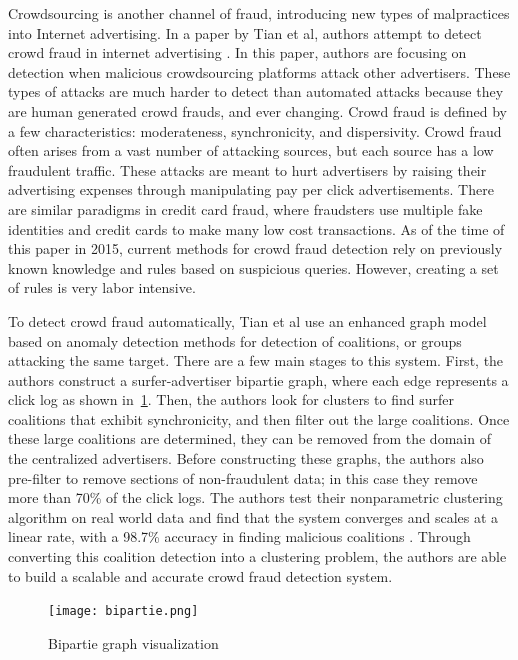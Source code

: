 \documentclass[midd]{thesis}
\begin{document}
Crowdsourcing is another channel of fraud, introducing new types of malpractices into Internet advertising. In a paper by Tian et al, authors attempt to detect crowd fraud in internet advertising  \cite{Tian}. In this paper, authors are focusing on detection when malicious crowdsourcing platforms attack other advertisers. These types of attacks are much harder to detect than automated attacks because they are human generated crowd frauds, and ever changing. Crowd fraud is defined by a few characteristics: moderateness, synchronicity, and dispersivity. Crowd fraud often arises from a vast number of attacking sources, but each source has a low fraudulent traffic. These attacks are meant to hurt advertisers by raising their advertising expenses through manipulating pay per click advertisements. There are similar paradigms in credit card fraud, where fraudsters use multiple fake identities and credit cards to make many low cost transactions. As of the time of this paper in 2015, current methods for crowd fraud detection rely on previously known knowledge and rules based on suspicious queries. However, creating a set of rules is very labor intensive. 

To detect crowd fraud automatically, Tian et al use an enhanced graph model based on anomaly detection methods for detection of coalitions, or groups attacking the same target. There are a few main stages to this system. First, the authors construct a surfer-advertiser bipartie graph, where each edge represents a click log as shown in~\ref{fig:bipartie}. Then, the authors look for clusters to find surfer coalitions that exhibit synchronicity, and then filter out the large coalitions. Once these large coalitions are determined, they can be removed from the domain of the centralized advertisers. Before constructing these graphs, the authors also pre-filter to remove sections of non-fraudulent data; in this case they remove more than 70\% of the click logs. The authors test their nonparametric clustering algorithm on real world data and find that the system converges and scales at a linear rate, with a 98.7\% accuracy in finding malicious coalitions \cite{Tian}. Through converting this coalition detection into a clustering problem, the authors are able to build a scalable and accurate crowd fraud detection system. 

\begin{figure} %
  \texttt{[image: bipartie.png]}
  \caption{Bipartie graph visualization \cite{Tian}}
  \label{fig:bipartie}
\end{figure}
\end{document}
